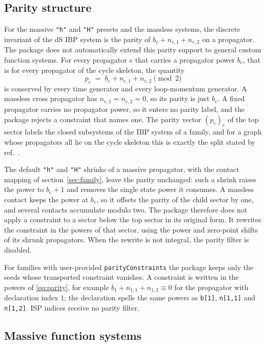 \documentclass[11pt,a4paper]{article}
\begin{document}
\subsection{Parity structure}
\label{sec:parity}

For the massive \texttt{"h"} and \texttt{"H"} presets and the massless systems, the discrete
invariant of the dS IBP system is the parity of $b_e+n_{e,1}+n_{e,2}$ on a propagator.
The package does not automatically extend this parity support to general custom function systems.
For every propagator $e$ that carries a propagator power
$b_e$, that is for every propagator of the
cycle skeleton, the quantity
\begin{equation}
p_e \;=\; b_e+n_{e,1}+n_{e,2} \pmod 2
\label{eq:parity}
\end{equation}
is conserved by every time generator and every loop-momentum generator. A massless cross propagator has
$n_{e,1}=n_{e,2}=0$, so its parity is just $b_e$. A fixed propagator carries no propagator power, so it
enters no parity label, and the package rejects a constraint that names one. The parity vector
$(p_e)_e$ of the top sector labels the closed subsystems of the IBP system of a family, and for a
graph whose propagators all lie on the cycle skeleton this is exactly the split stated by
ref.~\cite{Chen:2026dqp}.

The default \texttt{"h"}
and \texttt{"H"} shrinks of a massive propagator, with the contact mapping of section~\ref{sec:family}, leave the parity
unchanged: such a shrink raises the power to $b_e+1$ and removes the single state power it consumes. A
massless contact keeps the power at $b_e$, so it offsets the parity of the child sector by one, and
several contacts accumulate modulo two. The package therefore does not apply a constraint to a sector
below the top sector in its original form. It rewrites the constraint in the powers of that sector,
using the power and zero-point shifts of its shrunk propagators. When the rewrite is not integral, the
parity filter is disabled.

For families with
user-provided \texttt{parityConstraints} the package keeps only the seeds whose transported constraint
vanishes. A constraint is written in the powers of \eqref{eq:parity}, for example
$b_1+n_{1,1}+n_{1,2}\equiv0$ for the propagator with declaration index $1$; the declaration spells
the same powers as \texttt{b[1]}, \texttt{n[1,1]} and \texttt{n[1,2]}. ISP indices receive no
parity filter.

\subsection{Massive function systems}
\label{sec:dynamics}
\end{document}
